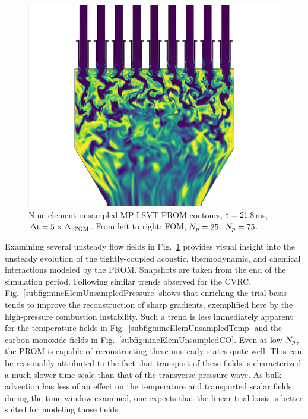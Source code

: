 \begin{figure}
{\begin{minipage}{0.32\linewidth}
		\includegraphics[width=0.99\linewidth,trim={0.5em 0.5em 15.0em 0.5em},clip]{Chapters/HPROMResults/Images/nineElem/unsampled/rom_k75_co_z.png}
	\end{minipage}
	}

	\caption{\label{fig:nineElemUnsampledContours}Nine-element unsampled MP-LSVT PROM contours, $\text{t} = 21.8$ms, $\Delta \text{t} = 5 \times \Delta \text{t}_{\text{FOM}}$. From left to right: FOM, $N_p=25$, $N_p=75$.}
\end{figure}

Examining several unsteady flow fields in Fig.~\ref{fig:nineElemUnsampledContours} provides visual insight into the unsteady evolution of the tightly-coupled acoustic, thermodynamic, and chemical interactions modeled by the PROM. Snapshots are taken from the end of the simulation period. Following similar trends observed for the CVRC, Fig.~\ref{subfig:nineElemUnsampledPressure} shows that enriching the trial basis tends to improve the reconstruction of sharp gradients, exemplified here by the high-pressure combustion instability. Such a trend is less immediately apparent for the temperature fields in Fig.~\ref{subfig:nineElemUnsampledTemp} and the carbon monoxide fields in Fig.~\ref{subfig:nineElemUnsampledCO}. Even at low $N_p$, the PROM is capable of reconstructing these unsteady states quite well. This can be reasonably attributed to the fact that transport of these fields is characterized a much slower time scale than that of the transverse pressure wave. As bulk advection has less of an effect on the temperature and transported scalar fields during the time window examined, one expects that the linear trial basis is better suited for modeling those fields.

